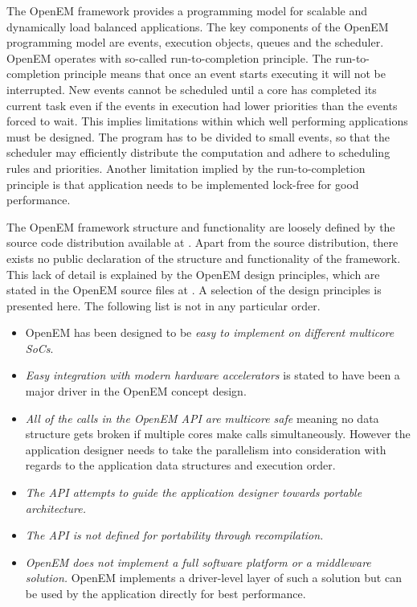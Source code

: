 The OpenEM framework provides a programming model for scalable and dynamically load balanced applications. The key components of the OpenEM programming model are events, execution objects, queues and the scheduler. OpenEM operates with so-called run-to-completion principle. The run-to-completion principle means that once an event starts executing it will not be interrupted. New events cannot be scheduled until a core has completed its current task even if the events in execution had lower priorities than the events forced to wait. This implies limitations within which well performing applications must be designed. The program has to be divided to small events, so that the scheduler may efficiently distribute the computation and adhere to scheduling rules and priorities. Another limitation implied by the run-to-completion principle is that application needs to be implemented lock-free for good performance.~\cite{openempage}

The OpenEM framework structure and functionality are loosely defined by the source code distribution available at \cite{openempage}. Apart from the source distribution, there exists no public declaration of the structure and functionality of the framework. This lack of detail is explained by the OpenEM design principles, which are stated in the OpenEM source files at \cite{openempage}. A selection of the design principles is presented here. The following list is not in any particular order.

\begin{itemize}
    \item OpenEM has been designed to be \emph{easy to implement on different multicore SoCs}.
    \item \emph{Easy integration with modern hardware accelerators} is stated to have been a major driver in the OpenEM concept design.
    \item \emph{All of the calls in the OpenEM API are multicore safe} meaning no data structure gets broken if multiple cores make calls simultaneously. However the application designer needs to take the parallelism into consideration with regards to the application data structures and execution order.
    \item \emph{The API attempts to guide the application designer towards portable architecture.}
    \item \emph{The API is not defined for portability through recompilation.}
    \item \emph{OpenEM does not implement a full software platform or a middleware solution.} OpenEM implements a driver-level layer of such a solution but can be used by the application directly for best performance.
\end{itemize}

